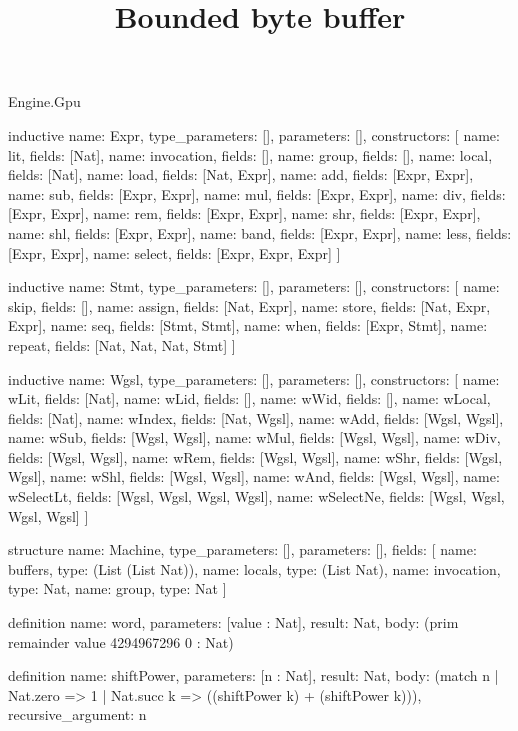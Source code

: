 \begin{lexlean}{Engine.Gpu}
\title{Bounded byte buffer}
\begin{semanticmodule}
inductive{
  name: Expr,
  type_parameters: [],
  parameters: [],
  constructors: [
    {name: lit, fields: [Nat]},
    {name: invocation, fields: []},
    {name: group, fields: []},
    {name: local, fields: [Nat]},
    {name: load, fields: [Nat, Expr]},
    {name: add, fields: [Expr, Expr]},
    {name: sub, fields: [Expr, Expr]},
    {name: mul, fields: [Expr, Expr]},
    {name: div, fields: [Expr, Expr]},
    {name: rem, fields: [Expr, Expr]},
    {name: shr, fields: [Expr, Expr]},
    {name: shl, fields: [Expr, Expr]},
    {name: band, fields: [Expr, Expr]},
    {name: less, fields: [Expr, Expr]},
    {name: select, fields: [Expr, Expr, Expr]}
  ]
}

inductive{
  name: Stmt,
  type_parameters: [],
  parameters: [],
  constructors: [
    {name: skip, fields: []},
    {name: assign, fields: [Nat, Expr]},
    {name: store, fields: [Nat, Expr, Expr]},
    {name: seq, fields: [Stmt, Stmt]},
    {name: when, fields: [Expr, Stmt]},
    {name: repeat, fields: [Nat, Nat, Nat, Stmt]}
  ]
}

inductive{
  name: Wgsl,
  type_parameters: [],
  parameters: [],
  constructors: [
    {name: wLit, fields: [Nat]},
    {name: wLid, fields: []},
    {name: wWid, fields: []},
    {name: wLocal, fields: [Nat]},
    {name: wIndex, fields: [Nat, Wgsl]},
    {name: wAdd, fields: [Wgsl, Wgsl]},
    {name: wSub, fields: [Wgsl, Wgsl]},
    {name: wMul, fields: [Wgsl, Wgsl]},
    {name: wDiv, fields: [Wgsl, Wgsl]},
    {name: wRem, fields: [Wgsl, Wgsl]},
    {name: wShr, fields: [Wgsl, Wgsl]},
    {name: wShl, fields: [Wgsl, Wgsl]},
    {name: wAnd, fields: [Wgsl, Wgsl]},
    {name: wSelectLt, fields: [Wgsl, Wgsl, Wgsl, Wgsl]},
    {name: wSelectNe, fields: [Wgsl, Wgsl, Wgsl, Wgsl]}
  ]
}

structure{
  name: Machine,
  type_parameters: [],
  parameters: [],
  fields: [
    {name: buffers, type: (List (List Nat))},
    {name: locals, type: (List Nat)},
    {name: invocation, type: Nat},
    {name: group, type: Nat}
  ]
}

definition{
  name: word,
  parameters: [value : Nat],
  result: Nat,
  body: (prim remainder value 4294967296 0 : Nat)
}

definition{
  name: shiftPower,
  parameters: [n : Nat],
  result: Nat,
  body: (match n | Nat.zero => 1 | Nat.succ k => ((shiftPower k) + (shiftPower k))),
  recursive_argument: n
}


\end{semanticmodule}
\end{lexlean}
